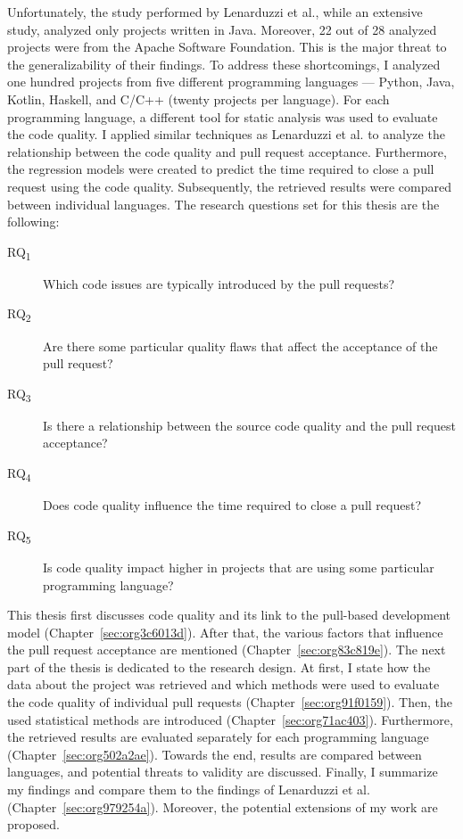 \documentclass[digital,oneside,oldtable,nolof,nolot,nocover]{fithesis4}
\begin{document}
Unfortunately, the study performed by Lenarduzzi et al., while an extensive
study, analyzed only projects written in Java. Moreover, 22 out of 28 analyzed
projects were from the Apache Software Foundation. This is the major threat to
the generalizability of their findings. To address these shortcomings, I
analyzed one hundred projects from five different programming languages ---
Python, Java, Kotlin, Haskell, and C/C++ (twenty projects per language). For
each programming language, a different tool for static analysis was used to
evaluate the code quality. I applied similar techniques as Lenarduzzi et
al. to analyze the relationship between the code quality and pull request
acceptance. Furthermore, the regression models were created to predict the
time required to close a pull request using the code quality. Subsequently,
the retrieved results were compared between individual languages.
The research questions set for this thesis are the following:
\begin{description}
\item[{RQ\textsubscript{1}}] Which code issues are typically introduced by the pull requests?
\item[{RQ\textsubscript{2}}] Are there some particular quality flaws that affect the acceptance of the pull request?
\item[{RQ\textsubscript{3}}] Is there a relationship between the source code quality and the pull request acceptance?
\item[{RQ\textsubscript{4}}] Does code quality influence the time required to close a pull request?
\item[{RQ\textsubscript{5}}] Is code quality impact higher in projects that are using some particular programming language?
\end{description}

This thesis first discusses code quality and its link to the pull-based
development model (Chapter~\ref{sec:org3c6013d}).
After that, the various factors that influence the pull request acceptance are
mentioned (Chapter~\ref{sec:org83c819e}). The next part of the thesis
is dedicated to the research design. At first, I state how the data about the
project was retrieved and which methods were used to evaluate the code quality
of individual pull requests (Chapter~\ref{sec:org91f0159}). Then, the used
statistical methods are introduced (Chapter~\ref{sec:org71ac403}). Furthermore,
the retrieved results are evaluated separately for each programming language
(Chapter~\ref{sec:org502a2ae}). Towards the end, results are compared between
languages, and potential threats to validity are discussed. Finally, I
summarize my findings and compare them to the findings of Lenarduzzi et al.
(Chapter~\ref{sec:org979254a}). Moreover, the potential extensions of my work are
proposed.
\end{document}
